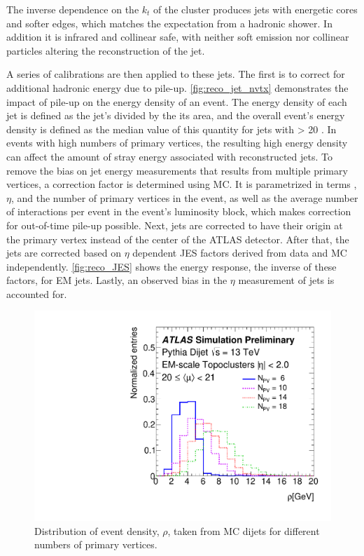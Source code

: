 The inverse dependence on the $k_t$ of the cluster produces jets with energetic cores and softer edges, which matches the expectation from a hadronic shower. In addition it is infrared and collinear safe, with neither soft emission nor collinear particles altering the reconstruction of the jet.

A series of calibrations are then applied to these jets. The first is to correct for additional hadronic energy due to pile-up. \autoref{fig:reco_jet_nvtx} demonstrates the impact of pile-up on the energy density of an event. The energy density of each jet is defined as the jet's \pt divided by the its area, and the overall event's energy density is defined as the median value of this quantity for jets with \pt > 20 \gev. In events with high numbers of primary vertices, the resulting high energy density can affect the amount of stray energy associated with reconstructed jets. To remove the bias on jet energy measurements that results from multiple primary vertices, a correction factor is determined using \ac{MC}. It is parametrized in terms \pt, $\eta$, and the number of primary vertices in the event, as well as the average number of interactions per event in the event's luminosity block, which makes correction for out-of-time pile-up possible. Next, jets are corrected to have their origin at the primary vertex instead of the center of the \ac{ATLAS} detector. After that, the jets are corrected based on $\eta$ dependent \acf{JES} factors derived from data and \ac{MC} independently. \autoref{fig:reco_JES} shows the energy response, the inverse of these factors, for \ac{EM} jets. Lastly, an observed bias in the $\eta$ measurement of jets is accounted for. 

\begin{centering}
\begin{figure}[!hbt]
\myfloatalign
\includegraphics[width=.9\linewidth]{figures/reco/fig_02.pdf}
\caption{ Distribution of event \pt density, $\rho$, taken from \ac{MC} dijets for different numbers of primary vertices. \cite{ATL-PHYS-PUB-2015-015} }
\label{fig:reco_jet_nvtx}
\end{figure}
\end{centering}

